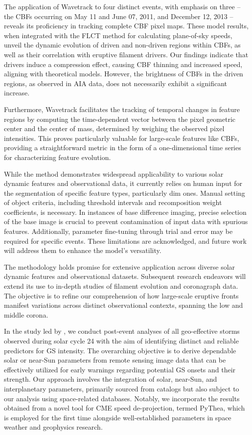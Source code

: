The application of Wavetrack to four distinct events, with emphasis on three – the CBFs occurring on May 11 and June 07, 2011, and December 12, 2013 – reveals its proficiency in tracking complete CBF pixel maps. These model results, when integrated with the FLCT method for calculating plane-of-sky speeds, unveil the dynamic evolution of driven and non-driven regions within CBFs, as well as their correlation with eruptive filament drivers. Our findings indicate that drivers induce a compression effect, causing CBF thinning and increased speed, aligning with theoretical models. However, the brightness of CBFs in the driven regions, as observed in AIA data, does not necessarily exhibit a significant increase.

Furthermore, Wavetrack facilitates the tracking of temporal changes in feature regions by computing the time-dependent vector between the pixel geometric center and the center of mass, determined by weighing the observed pixel intensities. This proves particularly valuable for large-scale features like CBFs, providing a straightforward metric in the form of a one-dimensional time series for characterizing feature evolution.

While the method demonstrates widespread applicability to various solar dynamic features and observational data, it currently relies on human input for the segmentation of specific feature types, particularly dim ones. Manual setting of object criteria, including threshold intervals and recomposition weight coefficients, is necessary. In instances of base difference imaging, precise selection of the base image is crucial to prevent contamination of input data with spurious features. Additionally, parameter fine-tuning through trial and error may be required for specific events. These limitations are acknowledged, and future work will address them to enhance the model's versatility.

The methodology holds promise for extensive application across diverse solar dynamic features and observational datasets. Subsequent research endeavors will extend its use to in-depth studies of filament evolution and coronagraph data. The objective is to refine our comprehension of how large-scale eruptive fronts manifest variations across distinct observational contexts, spanning the low and middle corona.

In the study led by \citet{miteva_2023}, we conduct post-event analyses of all geo-effective storms observed during solar cycle 24 with the aim of identifying distinct and reliable predictors for GS intensity. The overarching objective is to derive dependable solar or near-Sun parameters from remote sensing image data that can be effectively utilized for early warnings regarding potential GS onsets and their strength. Our approach involves the integration of solar, near-Sun, and interplanetary parameters, primarily sourced from catalogs but also subject to our analysis using space-related databases. Notably, we incorporate the results obtained from a novel tool for CME speed de-projection, termed PyThea, which is employed for the first time alongside well-established parameters in space weather and geophysics research.

